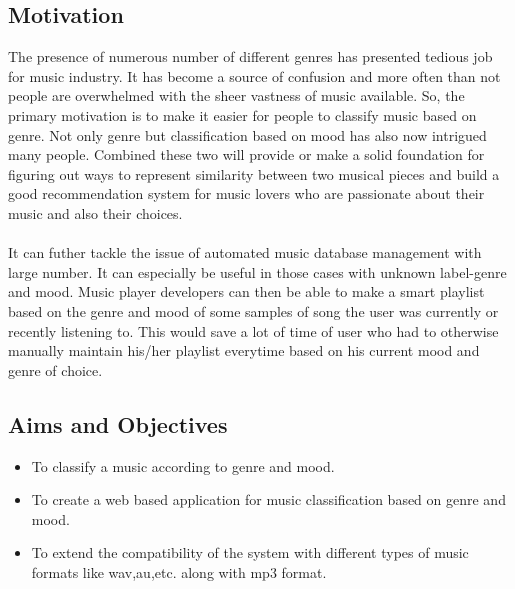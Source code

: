 \subsection{Motivation}
The presence of numerous number of different genres has presented tedious job for music industry. It has become
a source of confusion and more often than not people are overwhelmed with the sheer vastness of music available.
So, the primary motivation is to make it easier for people to classify music based on genre. Not only
genre but classification based on mood has also now intrigued many people. Combined these two will provide 
or make a solid foundation for figuring out ways to represent similarity between two musical pieces and build a good recommendation
system for music lovers who are passionate about their music and also their choices.\\
\\
It can futher tackle the issue of automated music database management with large number.  It can especially be useful 
in those cases with unknown label-genre and mood. Music player developers can then be able to make a smart playlist based on the genre 
and mood of some samples of song the user was currently or recently listening to. This would save a lot of time of user who had to
otherwise manually maintain his/her playlist everytime based on his current mood and genre of choice.

\subsection{Aims and Objectives}
\begin{itemize}
        \item To classify a music according to genre and mood.
        \item To create a web based application for music classification based on genre and mood.
        \item To extend the compatibility of the system with different types of music formats like wav,au,etc. along with mp3 format.
\end{itemize}

